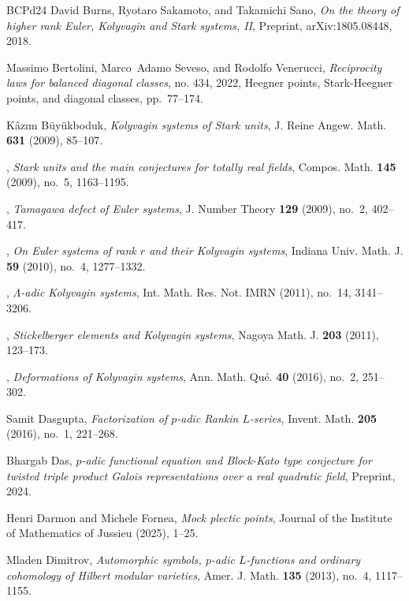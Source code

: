 \documentclass[10pt]{amsart}
\numberwithin{equation}{section}
\theoremstyle{definition}
\theoremstyle{remark} %
\begin{document}
\begin{thebibliography}{BCPd24}
David Burns, Ryotaro Sakamoto, and Takamichi Sano, \emph{On the theory of higher rank {E}uler, {K}olyvagin and {S}tark systems, {II}}, Preprint, {arXiv}:1805.08448, 2018.

Massimo Bertolini, Marco~Adamo Seveso, and Rodolfo Venerucci, \emph{Reciprocity laws for balanced diagonal classes}, no. 434, 2022, Heegner points, Stark-Heegner points, and diagonal classes, pp.~77--174. 

Kâzım B{\"u}yükboduk, \emph{Kolyvagin systems of {S}tark units}, J. Reine Angew. Math. \textbf{631} (2009), 85--107. 

\bysame, \emph{Stark units and the main conjectures for totally real fields}, Compos. Math. \textbf{145} (2009), no.~5, 1163--1195. 

\bysame, \emph{Tamagawa defect of {E}uler systems}, J. Number Theory \textbf{129} (2009), no.~2, 402--417. 

\bysame, \emph{On {E}uler systems of rank {$r$} and their {K}olyvagin systems}, Indiana Univ. Math. J. \textbf{59} (2010), no.~4, 1277--1332. 

\bysame, \emph{{$\Lambda$}-adic {K}olyvagin systems}, Int. Math. Res. Not. IMRN (2011), no.~14, 3141--3206. 

\bysame, \emph{Stickelberger elements and {K}olyvagin systems}, Nagoya Math. J. \textbf{203} (2011), 123--173. 

\bysame, \emph{Deformations of {K}olyvagin systems}, Ann. Math. Qu\'e. \textbf{40} (2016), no.~2, 251--302. 

Samit Dasgupta, \emph{Factorization of {$p$}-adic {R}ankin {$L$}-series}, Invent. Math. \textbf{205} (2016), no.~1, 221--268. 

Bhargab Das, \emph{$p$-adic functional equation and {B}lock-{K}ato type conjecture for twisted triple product {G}alois representations over a real quadratic field}, Preprint, 2024.

Henri Darmon and Michele Fornea, \emph{Mock plectic points}, Journal of the Institute of Mathematics of Jussieu (2025), 1–25.

Mladen Dimitrov, \emph{Automorphic symbols, {$p$}-adic {$L$}-functions and ordinary cohomology of {H}ilbert modular varieties}, Amer. J. Math. \textbf{135} (2013), no.~4, 1117--1155. 


\end{thebibliography}
\end{document}
